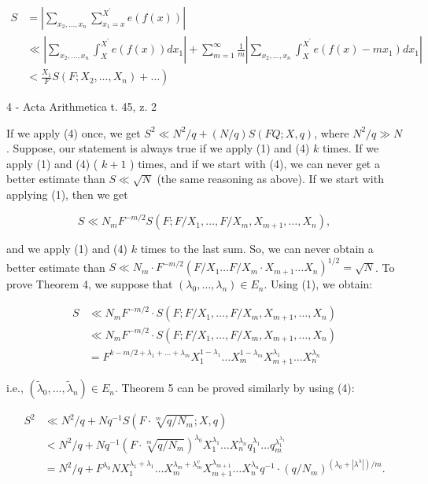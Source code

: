 \documentclass[10pt]{article}
\begin{document}
$$
\begin{aligned}
S & =\left|\sum_{x_{2}, \ldots, x_{n}} \sum_{x_{1}=x}^{X^{\prime}} e(f(x))\right| \\
& \ll\left|\sum_{x_{2}, \ldots, x_{n}} \int_{X}^{X^{\prime}} e(f(x)) d x_{1}\right|+\sum_{m=1}^{\infty} \frac{1}{m}\left|\sum_{x_{2}, \ldots, x_{n}} \int_{X}^{X^{\prime}} e\left(f(x)-m x_{1}\right) d x_{1}\right| \\
& \left.<\frac{X_{1}}{F} S\left(F ; X_{2}, \ldots, X_{n}\right)+\ldots\right)
\end{aligned}
$$

4 - Acta Arithmetica t. 45, z. 2

If we apply (4) once, we get $S^{2} \ll N^{2} / q+(N / q) S(F Q ; X, q)$, where $N^{2} / q \gg N$. Suppose, our statement is always true if we apply (1) and (4) $k$ times. If we apply (1) and (4) ( $k+1$ ) times, and if we start with (4), we can never get a better estimate than $S \ll \sqrt{N}$ (the same reasoning as above). If we start with applying (1), then we get

$$
S \ll N_{m} F^{-m / 2} S\left(F ; F / X_{1}, \ldots, F / X_{m}, X_{m+1}, \ldots, X_{n}\right),
$$

and we apply (1) and (4) $k$ times to the last sum. So, we can never obtain a better estimate than $S \ll N_{m} \cdot F^{-m / 2}\left(F / X_{1} \ldots F / X_{m} \cdot X_{m+1} \ldots X_{n}\right)^{1 / 2}=\sqrt{N}$. To prove Theorem 4, we suppose that $\left(\lambda_{0}, \ldots, \lambda_{n}\right) \in E_{n}$. Using (1), we obtain:

$$
\begin{aligned}
S & \ll N_{m} F^{-m / 2} \cdot S\left(F ; F / X_{1}, \ldots, F / X_{m}, X_{m+1}, \ldots, X_{n}\right) \\
& \ll N_{m} F^{-m / 2} \cdot S\left(F ; F / X_{1}, \ldots, F / X_{m}, X_{m+1}, \ldots, X_{n}\right) \\
& =F^{k-m / 2+\lambda_{1}+\ldots+\lambda_{m}} X_{1}^{1-\lambda_{1}} \ldots X_{m}^{1-\lambda_{m}} X_{m+1}^{\lambda_{1}} \ldots X_{n}^{\lambda_{n}}
\end{aligned}
$$

i.e., $\left(\tilde{\lambda}_{0}, \ldots, \tilde{\lambda}_{n}\right) \in E_{n}$. Theorem 5 can be proved similarly by using (4):

$$
\begin{aligned}
S^{2} & \ll N^{2} / q+N q^{-1} S\left(F \cdot \sqrt[m]{q / N_{m}} ; X, q\right) \\
& <N^{2} / q+N q^{-1}\left(F \cdot \sqrt[m]{q / N_{m}}\right)^{\lambda_{0}} X_{1}^{\lambda_{1}} \ldots X_{n}^{\lambda_{n}} q_{1}^{\lambda_{1}} \ldots q_{m}^{\lambda_{1}^{\lambda_{1}}} \\
& =N^{2} / q+F^{\lambda_{0}} N X_{1}^{\lambda_{1}+\lambda_{1}} \ldots X_{m}^{\lambda_{m}+\lambda_{m}^{v}} X_{m+1}^{\lambda_{m+1}} \ldots X_{n}^{\lambda_{n}} q^{-1} \cdot\left(q / N_{m}\right)^{\left(\lambda_{0}+\left|\lambda^{\lambda}\right|\right) / m} .
\end{aligned}
$$
\end{document}
